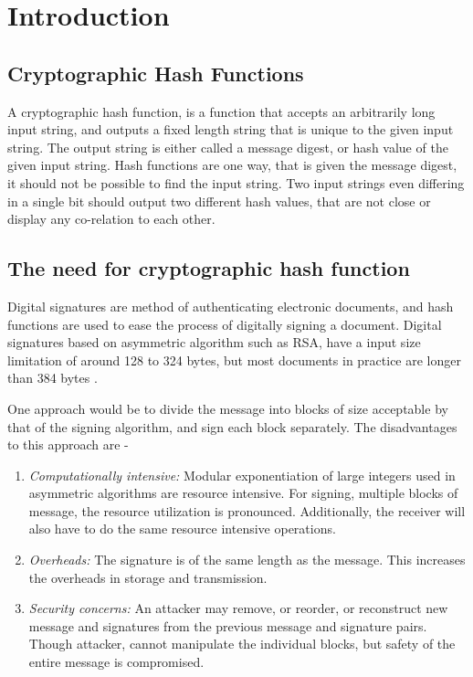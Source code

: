 \chapter{Introduction}

\section{Cryptographic Hash Functions}

A cryptographic hash function, is a function that accepts an arbitrarily long input string, and outputs
a fixed length string that is unique to the given input string. The output string is either called a message
digest, or hash value of the given input string. Hash functions are one way, that is given the message
digest, it should not be possible to find the input string. Two input strings even differing in a single
bit should output two different hash values, that are not close or display any co-relation to each other.

\section{The need for cryptographic hash function} 

Digital signatures are method of authenticating electronic documents, and hash functions are used to ease the
process of digitally signing a document. Digital signatures based on asymmetric algorithm such as RSA, have a 
input size limitation of around 128 to 324 bytes, but most documents in practice are longer than 384 bytes
\cite{00017}.

One approach would be to divide the message into blocks of size acceptable by that of the signing 
algorithm, and sign each block separately. The disadvantages to this approach are -

\begin{enumerate}
  \item \emph{Computationally intensive:} Modular exponentiation of large integers used in asymmetric
  algorithms are resource intensive. For signing, multiple blocks of message, the resource utilization
  is pronounced. Additionally, the receiver will also have to do the same resource intensive operations.
  \item \emph{Overheads:} The signature is of the same length as the message. This increases the overheads
  in storage and transmission.
  \item \emph{Security concerns:} An attacker may remove, or reorder, or reconstruct new message and 
  signatures from the previous message and signature pairs. Though attacker, cannot manipulate the individual
  blocks, but safety of the entire message is compromised.
\end{enumerate}

